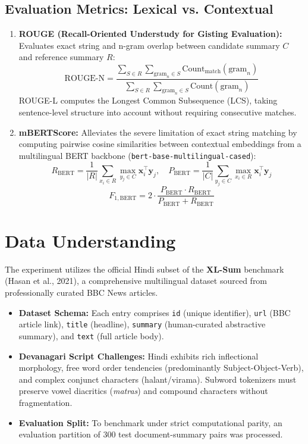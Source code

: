 \documentclass[12pt,a4paper]{report}
\begin{document}
\subsection{Evaluation Metrics: Lexical vs. Contextual}
\begin{enumerate}
    \item \textbf{ROUGE (Recall-Oriented Understudy for Gisting Evaluation):} Evaluates exact string and n-gram overlap between candidate summary $C$ and reference summary $R$:
    \begin{equation}
        \text{ROUGE-N} = \frac{\sum_{S \in R} \sum_{\text{gram}_n \in S} \text{Count}_{\text{match}}(\text{gram}_n)}{\sum_{S \in R} \sum_{\text{gram}_n \in S} \text{Count}(\text{gram}_n)}
    \end{equation}
    ROUGE-L computes the Longest Common Subsequence (LCS), taking sentence-level structure into account without requiring consecutive matches.
    \item \textbf{mBERTScore:} Alleviates the severe limitation of exact string matching by computing pairwise cosine similarities between contextual embeddings from a multilingual BERT backbone (\texttt{bert-base-multilingual-cased}):
    \begin{equation}
        R_{\text{BERT}} = \frac{1}{|R|} \sum_{x_i \in R} \max_{y_j \in C} \mathbf{x}_i^\top \mathbf{y}_j, \quad P_{\text{BERT}} = \frac{1}{|C|} \sum_{y_j \in C} \max_{x_i \in R} \mathbf{x}_i^\top \mathbf{y}_j
    \end{equation}
    \begin{equation}
        F_{1, \text{BERT}} = 2 \cdot \frac{P_{\text{BERT}} \cdot R_{\text{BERT}}}{P_{\text{BERT}} + R_{\text{BERT}}}
    \end{equation}
\end{enumerate}

\section{Data Understanding}
The experiment utilizes the official Hindi subset of the \textbf{XL-Sum} benchmark (Hasan et al., 2021), a comprehensive multilingual dataset sourced from professionally curated BBC News articles.
\begin{itemize}
    \item \textbf{Dataset Schema:} Each entry comprises \texttt{id} (unique identifier), \texttt{url} (BBC article link), \texttt{title} (headline), \texttt{summary} (human-curated abstractive summary), and \texttt{text} (full article body).
    \item \textbf{Devanagari Script Challenges:} Hindi exhibits rich inflectional morphology, free word order tendencies (predominantly Subject-Object-Verb), and complex conjunct characters (halant/virama). Subword tokenizers must preserve vowel diacritics (\textit{matras}) and compound characters without fragmentation.
    \item \textbf{Evaluation Split:} To benchmark under strict computational parity, an evaluation partition of 300 test document-summary pairs was processed.
\end{itemize}
\end{document}
